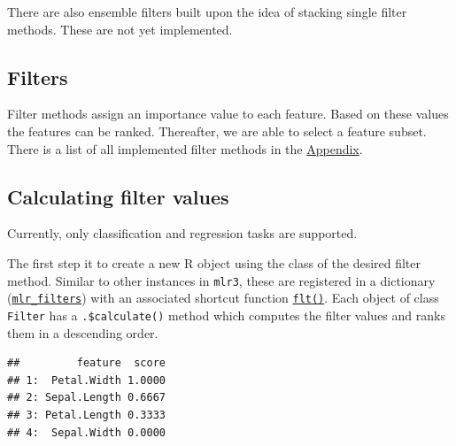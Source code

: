 \documentclass[
]{scrbook}
\newenvironment{Shaded}{\begin{snugshade}}{\end{snugshade}}
\newcommand{\FunctionTok}[1]{\textcolor[rgb]{0.00,0.00,0.00}{#1}}
\newcommand{\NormalTok}[1]{#1}
\newcommand{\OtherTok}[1]{\textcolor[rgb]{0.56,0.35,0.01}{#1}}
\newcommand{\SpecialCharTok}[1]{\textcolor[rgb]{0.00,0.00,0.00}{#1}}
\newcommand{\StringTok}[1]{\textcolor[rgb]{0.31,0.60,0.02}{#1}}
\renewenvironment{Shaded} {\begin{snugshade}\small} {\end{snugshade}}
\begin{document}
There are also ensemble filters built upon the idea of stacking single filter methods. These are not yet implemented.

\hypertarget{fs-filter}{%
\subsection{Filters}\label{fs-filter}}

Filter methods assign an importance value to each feature.
Based on these values the features can be ranked.
Thereafter, we are able to select a feature subset.
There is a list of all implemented filter methods in the \protect\hyperlink{list-filters}{Appendix}.

\hypertarget{fs-calc}{%
\subsection{Calculating filter values}\label{fs-calc}}

Currently, only classification and regression tasks are supported.

The first step it to create a new R object using the class of the desired filter method.
Similar to other instances in \texttt{mlr3}, these are registered in a dictionary (\href{https://mlr3filters.mlr-org.com/reference/mlr_filters.html}{\texttt{mlr\_filters}}) with an associated shortcut function \href{https://mlr3filters.mlr-org.com/reference/flt.html}{\texttt{flt()}}.
Each object of class \texttt{Filter} has a \texttt{.\$calculate()} method which computes the filter values and ranks them in a descending order.

\begin{Shaded}
\end{Shaded}

\begin{verbatim}
##         feature  score
## 1:  Petal.Width 1.0000
## 2: Sepal.Length 0.6667
## 3: Petal.Length 0.3333
## 4:  Sepal.Width 0.0000
\end{verbatim}
\end{document}
